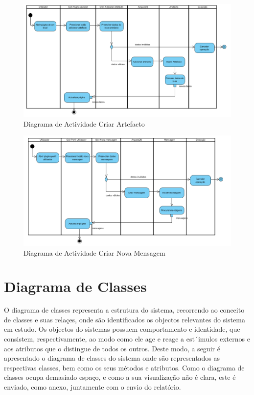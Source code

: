\documentclass[12pt,a4paper]{article}
\begin{document}
\begin{figure}[h!]
\centering
\includegraphics[scale=0.6]{actividade/criarartefacto}
\caption{Diagrama de Actividade Criar Artefacto} 
\end{figure} 

\begin{figure}[h!]
\centering
\includegraphics[scale=0.6]{actividade/novamensagem}
\caption{Diagrama de Actividade Criar Nova Mensagem} 
\end{figure} 

\clearpage
\section{Diagrama de Classes}
O diagrama de classes representa a estrutura do sistema, recorrendo ao conceito de classes
e suas relaçes, onde são identificados os objectos relevantes do sistema em estudo. Os objectos do sistemas possuem comportamento e identidade, que consistem, respectivamente, ao modo como ele age e reage a est´imulos externos e aos atributos que o distingue de todos os outros.
Deste modo, a seguir é apresentado o diagrama de classes do sistema onde são representados as respectivas classes, bem como os seus métodos e atributos. Como o diagrama de classes ocupa demasiado espaço, e como  a sua visualização não é clara, este é enviado, como anexo, juntamente com o envio do relatório.\\
\end{document}
